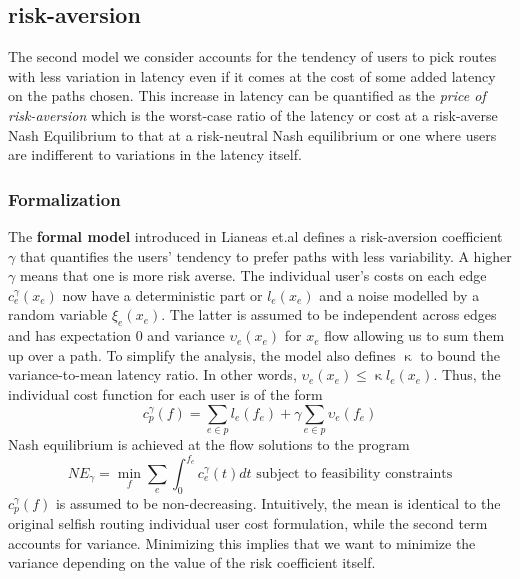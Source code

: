 \subsection{risk-aversion}
The second model we consider accounts for the
tendency of users to pick routes with less variation in latency even if it comes at the cost of some added
latency on the paths chosen. This increase in latency can be quantified as the {\em{price of risk-aversion}}
which is the worst-case ratio of the latency or cost at a risk-averse Nash Equilibrium to that at a risk-neutral
Nash equilibrium or one where users are indifferent to variations in the latency itself.


\subsubsection{Formalization} The {\textbf{formal model}} introduced in Lianeas et.al \cite{risk-averse} defines 
a risk-aversion coefficient $\gamma$ that quantifies the users' tendency to prefer paths with less variability. 
A higher $\gamma$ means that one is more risk averse. The individual user's costs on each edge $c^\gamma_e(x_e)$ now have a deterministic part or $l_e(x_e)$ and a noise modelled by a random variable $\xi_e(x_e)$. The latter is assumed to be independent across edges 
and has expectation $0$ and variance $\upsilon_e(x_e)$ for $x_e$ flow allowing us to sum them up over a path. To simplify 
the analysis, the model also defines $\upkappa$ to bound the variance-to-mean latency ratio. In other words, 
$\upsilon_e(x_e) \leq \upkappa l_e(x_e)$.
Thus, the individual cost function for each user is of the form
$$c^\gamma_p(f) = \sum_{e \in p}l_e(f_e) + \gamma \sum_{e \in p}\upsilon_e(f_e)$$
Nash equilibrium is achieved at the flow solutions to the program
$$NE_\gamma= \min_f\sum_e\int_0^{f_e}c_e^\gamma(t)dt \text{ subject to feasibility constraints}$$
$c^\gamma_p(f)$ is assumed to be non-decreasing. Intuitively, the mean is identical to the original selfish routing individual user cost
formulation, while the second term accounts for variance. Minimizing this implies that we want to minimize the variance depending on the
value of the risk coefficient itself.

